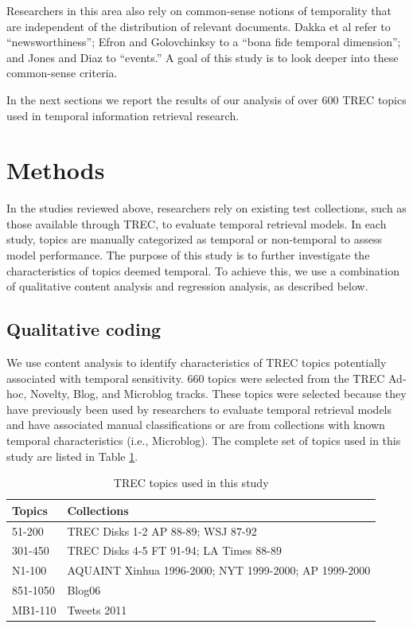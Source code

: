 \documentclass[runningheads,a4paper]{llncs}
\begin{document}
Researchers in this area also rely on common-sense notions of temporality that are independent of the distribution of relevant documents. Dakka et al refer to ``newsworthiness''; Efron and Golovchinksy to a ``bona fide temporal dimension''; and Jones and Diaz to ``events.''  A goal of this study is to look deeper into these common-sense criteria.

In the next sections we report the results of our analysis of over 600 TREC topics used in temporal information retrieval research. 

\section{Methods}

In the studies reviewed above, researchers rely on existing test collections, such as those available through TREC, to evaluate temporal retrieval models. In each study, topics are manually categorized as temporal or non-temporal to assess model performance. The purpose of this study is to further investigate the characteristics of topics deemed temporal. To achieve this, we use a combination of qualitative content analysis and regression analysis, as described below.

\subsection{Qualitative coding}
We use content analysis \cite{Krippendorf1980} to identify characteristics of TREC topics potentially associated with temporal sensitivity. 660 topics were selected from the TREC Ad-hoc, Novelty, Blog, and Microblog tracks. These topics were selected because they have previously been used by researchers to evaluate temporal retrieval models and have associated manual classifications or are from collections with known temporal characteristics (i.e., Microblog). The complete set of topics used in this study are listed in Table \ref{table.topics}.

\begin{table}
\center
\small
\begin{tabular}{| l | l|} \hline
\bf{Topics} & \bf{Collections}  \\ \hline
51-200 & TREC Disks 1-2 AP 88-89; WSJ 87-92 \\ \hline
301-450 &  TREC Disks 4-5 FT 91-94; LA Times 88-89 \\ \hline
N1-100 & AQUAINT Xinhua 1996-2000; NYT 1999-2000; AP 1999-2000 \\ \hline
851-1050 & Blog06  \\ \hline
MB1-110 & Tweets 2011 \\ \hline
\end{tabular}
\caption{TREC topics used in this study}
\label{table.topics}
\end{table}
\end{document}
